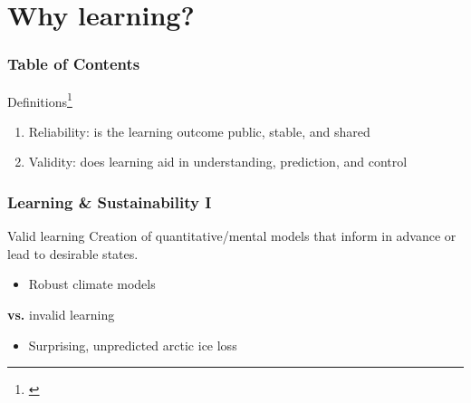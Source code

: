 
\section{Why learning?}
\begin{frame}
	\frametitle{Table of Contents}
\end{frame}

\begin{frame}[label=definition] 
	\begin{block}{Definitions\footnote{\citet{March1991a}}}
		\begin{enumerate}
			\item<1-> Reliability: is the learning outcome public, stable, and shared
			\item<2-> Validity: does learning aid in understanding, prediction, and control
		\end{enumerate}
	\end{block}
\end{frame}


\begin{frame}
	\frametitle{Learning \& Sustainability I}
	\begin{block}{Valid learning}
		Creation of quantitative/mental models that inform in advance or lead to desirable states.

		\hrulefill

		\begin{itemize}
			\item Robust climate models \citep{Manabe1967,Forster2017}
		\end{itemize}
		\centering \textbf{vs.} invalid learning
		\vspace{5pt}
		\begin{itemize}
			\item Surprising, unpredicted arctic ice loss \citep{Guarino2020}
		\end{itemize}
	\end{block}
\end{frame}

